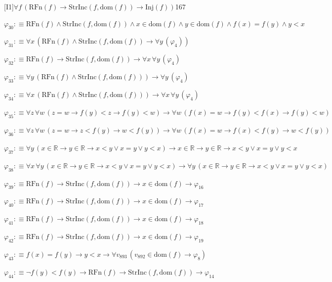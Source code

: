 \begin{fullproof}{[I1]}{$\forall f\,(\mathrm{RFn}(f) \to \mathrm{StrInc}(f,\mathrm{dom}(f)) \to \mathrm{Inj}(f))$}{167}
\begin{abbrevlist}
\item $\varphi_{30} :\equiv \mathrm{RFn}(f) \land \mathrm{StrInc}(f,\mathrm{dom}(f)) \land x \in \mathrm{dom}(f) \land y \in \mathrm{dom}(f) \land f(x) = f(y) \land y < x$
\item $\varphi_{31} :\equiv \forall x\,(\mathrm{RFn}(f) \land \mathrm{StrInc}(f,\mathrm{dom}(f)) \to \forall y\,(\varphi_{4}))$
\item $\varphi_{32} :\equiv \mathrm{RFn}(f) \to \mathrm{StrInc}(f,\mathrm{dom}(f)) \to \forall x\,\forall y\,(\varphi_{4})$
\item $\varphi_{33} :\equiv \forall y\,(\mathrm{RFn}(f) \land \mathrm{StrInc}(f,\mathrm{dom}(f))) \to \forall y\,(\varphi_{4})$
\item $\varphi_{34} :\equiv \forall x\,(\mathrm{RFn}(f) \land \mathrm{StrInc}(f,\mathrm{dom}(f))) \to \forall x\,\forall y\,(\varphi_{4})$
\item $\varphi_{35} :\equiv \forall z\,\forall w\,(z = w \to f(y) < z \to f(y) < w) \to \forall w\,(f(x) = w \to f(y) < f(x) \to f(y) < w)$
\item $\varphi_{36} :\equiv \forall z\,\forall w\,(z = w \to z < f(y) \to w < f(y)) \to \forall w\,(f(x) = w \to f(x) < f(y) \to w < f(y))$
\item $\varphi_{37} :\equiv \forall y\,(x \in \mathbb{R} \to y \in \mathbb{R} \to x < y \lor x = y \lor y < x) \to x \in \mathbb{R} \to y \in \mathbb{R} \to x < y \lor x = y \lor y < x$
\item $\varphi_{38} :\equiv \forall x\,\forall y\,(x \in \mathbb{R} \to y \in \mathbb{R} \to x < y \lor x = y \lor y < x) \to \forall y\,(x \in \mathbb{R} \to y \in \mathbb{R} \to x < y \lor x = y \lor y < x)$
\item $\varphi_{39} :\equiv \mathrm{RFn}(f) \to \mathrm{StrInc}(f,\mathrm{dom}(f)) \to x \in \mathrm{dom}(f) \to \varphi_{16}$
\item $\varphi_{40} :\equiv \mathrm{RFn}(f) \to \mathrm{StrInc}(f,\mathrm{dom}(f)) \to x \in \mathrm{dom}(f) \to \varphi_{17}$
\item $\varphi_{41} :\equiv \mathrm{RFn}(f) \to \mathrm{StrInc}(f,\mathrm{dom}(f)) \to x \in \mathrm{dom}(f) \to \varphi_{18}$
\item $\varphi_{42} :\equiv \mathrm{RFn}(f) \to \mathrm{StrInc}(f,\mathrm{dom}(f)) \to x \in \mathrm{dom}(f) \to \varphi_{19}$
\item $\varphi_{43} :\equiv f(x) = f(y) \to y < x \to \forall v_{893}\,(v_{892} \in \mathrm{dom}(f) \to \varphi_{8})$
\item $\varphi_{44} :\equiv \neg f(y) < f(y) \to \mathrm{RFn}(f) \to \mathrm{StrInc}(f,\mathrm{dom}(f)) \to \varphi_{14}$

\end{abbrevlist}
\end{fullproof}
